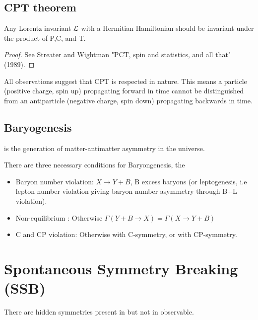 \documentclass{article}
\begin{document}
\subsection{CPT theorem}

\begin{theorem}
Any Lorentz invariant $\mathcal{L}$ with a Hermitian Hamiltonian should be invariant under the product of P,C, and T. 
\end{theorem}
\begin{proof}
See Streater and Wightman "PCT, spin and statistics, and all that" (1989).
\end{proof}
All observations suggest that CPT is respected in nature. This means 
 a particle (positive charge, spin up) propagating forward in time cannot be distinguished from an antiparticle (negative charge, spin down) propagating backwards in time. 
 
 \subsection{Baryogenesis}

\begin{definition}[Baryogenesis]
 is the generation of matter-antimatter asymmetry in the universe. 
\end{definition}

There are three necessary conditions for Baryongenesis, the 
\begin{itemize}
    \item Baryon number violation: $X \to Y+B$, B excess baryons (or leptogenesis, i.e lepton number violation giving baryon number asymmetry through B+L violation). 
    \item Non-equilibrium : Otherwise $\Gamma(Y+B \to X) = \Gamma(X \to Y+B)$
    \item C and CP violation: Otherwise  
    with C-symmetry, or 
    with CP-symmetry.
\end{itemize}

\section{Spontaneous Symmetry Breaking (SSB)}
There are hidden symmetries present in  but not in observable. 
\end{document}
